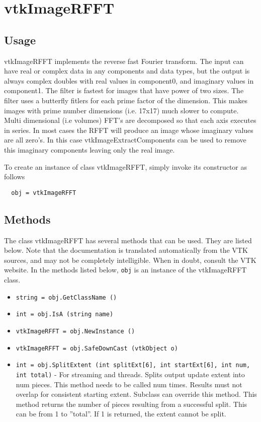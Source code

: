 \section{vtkImageRFFT}

\subsection{Usage}

 vtkImageRFFT implements the reverse fast Fourier transform.  The input
 can have real or complex data in any components and data types, but
 the output is always complex doubles with real values in component0, and
 imaginary values in component1.  The filter is fastest for images that
 have power of two sizes.  The filter uses a butterfly fitlers for each
 prime factor of the dimension.  This makes images with prime number dimensions 
 (i.e. 17x17) much slower to compute.  Multi dimensional (i.e volumes) 
 FFT's are decomposed so that each axis executes in series.
 In most cases the RFFT will produce an image whose imaginary values are all
 zero's. In this case vtkImageExtractComponents can be used to remove
 this imaginary components leaving only the real image.

To create an instance of class vtkImageRFFT, simply
invoke its constructor as follows
\begin{verbatim}
  obj = vtkImageRFFT
\end{verbatim}
\subsection{Methods}

The class vtkImageRFFT has several methods that can be used.
  They are listed below.
Note that the documentation is translated automatically from the VTK sources,
and may not be completely intelligible.  When in doubt, consult the VTK website.
In the methods listed below, \verb|obj| is an instance of the vtkImageRFFT class.
\begin{itemize}
\item  \verb|string = obj.GetClassName ()|

\item  \verb|int = obj.IsA (string name)|

\item  \verb|vtkImageRFFT = obj.NewInstance ()|

\item  \verb|vtkImageRFFT = obj.SafeDownCast (vtkObject o)|

\item  \verb|int = obj.SplitExtent (int splitExt[6], int startExt[6], int num, int total)| -  For streaming and threads.  Splits output update extent into num pieces.
 This method needs to be called num times.  Results must not overlap for
 consistent starting extent.  Subclass can override this method.  This
 method returns the number of pieces resulting from a successful split.
 This can be from 1 to ''total''.  If 1 is returned, the extent cannot be
 split.

\end{itemize}
